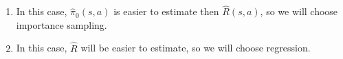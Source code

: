 \begin{answer}
    \begin{enumerate}
        \item In this case, $\hat \pi_0(s, a)$ is easier to estimate then $\hat R(s, a)$, so we will choose importance sampling.
        \item In this case, $\hat R$ will be easier to estimate, so we will choose regression.
    \end{enumerate}
\end{answer}
